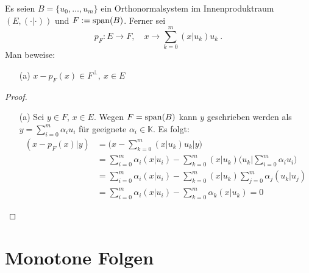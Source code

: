 \begin{aufgabe}
	Es seien $B = \{ u_0, \ldots, u_m \}$ ein Orthonormalsystem im Innenproduktraum $(E, (\cdot | \cdot))$
	und $F := \operatorname{span}(B)$. Ferner sei 
	\[
		p_F: E \to F, \quad x \to \sum_{k=0}^m (x | u_k) u_k \ .
	\]
	Man beweise:
	\begin{enumerate}
		\item[(a)] $x - p_F(x) \in F^\perp, \ x \in E$
	\end{enumerate}
\end{aufgabe}
\begin{proof}
	\begin{enumerate}
		\item[(a)] Sei $y \in F$, $x \in E$. Wegen $F = \operatorname{span}(B)$ kann $y$ geschrieben werden
			als $y = \sum_{i=0}^m \alpha_i u_i$ für geeignete $\alpha_i \in \mathbb K$. Es folgt:
			\begin{align*}
				( x - p_F(x) | y) 
					&= \Big( x - \sum_{k=0}^m (x | u_k) u_k \Big \vert y \Big) \\
					&= \sum_{i=0}^m \alpha_i (x | u_i)
						- \sum_{k=0}^m (x | u_k) \Big( u_k \Big \vert \sum_{i=0}^m \alpha_i u_i \Big) \\
					&= \sum_{i=0}^m \alpha_i (x | u_i) - \sum_{k=0}^m (x | u_k) \sum_{j=0}^m \alpha_j (u_k|u_j) \\
					&= \sum_{i=0}^m \alpha_i (x | u_i) - \sum_{k=0}^m \alpha_k (x | u_k) = 0
			\end{align*}
	\end{enumerate}
\end{proof}



\section{Monotone Folgen}

